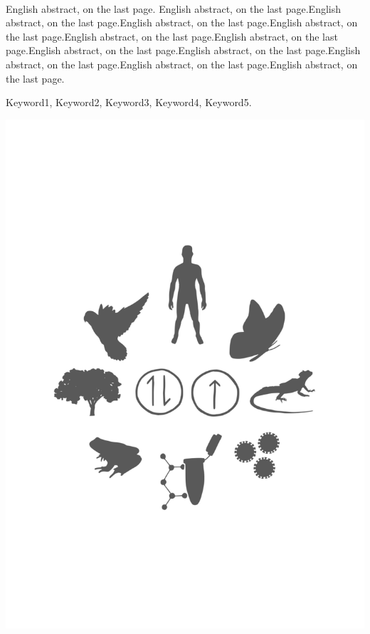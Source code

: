 \documentclass[
  9pt,
  american,
  a5paper,
  extrafontsizes,onecolumn,openright
  ]{memoir}
\makeatletter
\newcommand{\MemoirChapStyle}{daleif1}
\newcommand{\MemoirPageStyle}{Ruled}
\newlength\widthw %
\newcommand*{\SmallMargins}{
  \setlrmarginsandblock{0.75in}{0.75in}{*}
  \setmarginnotes{0.1in}{0.1in}{0.1in}
 \setulmarginsandblock{0.75in}{0.75in}{*}
  \checkandfixthelayout
  \ch@ngetext
  \clearpage
  \setlength{\widthw}{\textwidth+\marginparsep+\marginparwidth}
  \footnotesatfoot
  \chapterstyle{\MemoirChapStyle}  %
  \pagestyle{\MemoirPageStyle}
}
\newcommand{\evenpage}{
  \clearpage
  \strictpagecheck %
  \checkoddpage
  \ifoddpage
    \thispagestyle{empty}
    ~\\ %
    \newpage
  \else
  \fi
}
\makeatother
\begin{document}





\evenpage
\SmallMargins
\thispagestyle{empty}

\begin{normalsize}

\begin{description}

\item[Abstract]
English abstract, on the last page. English abstract, on the last page.English abstract, on the last page.English abstract, on the last page.English abstract, on the last page.English abstract, on the last page.English abstract, on the last page.English abstract, on the last page.English abstract, on the last page.English abstract, on the last page.English abstract, on the last page.English abstract, on the last page.
\item[Keywords]
Keyword1, Keyword2, Keyword3, Keyword4, Keyword5.
~\\

\end{description}

\end{normalsize}

\vspace*{\fill}
\centering\includegraphics[width=.3\textwidth]{images/logo}
\end{document}

